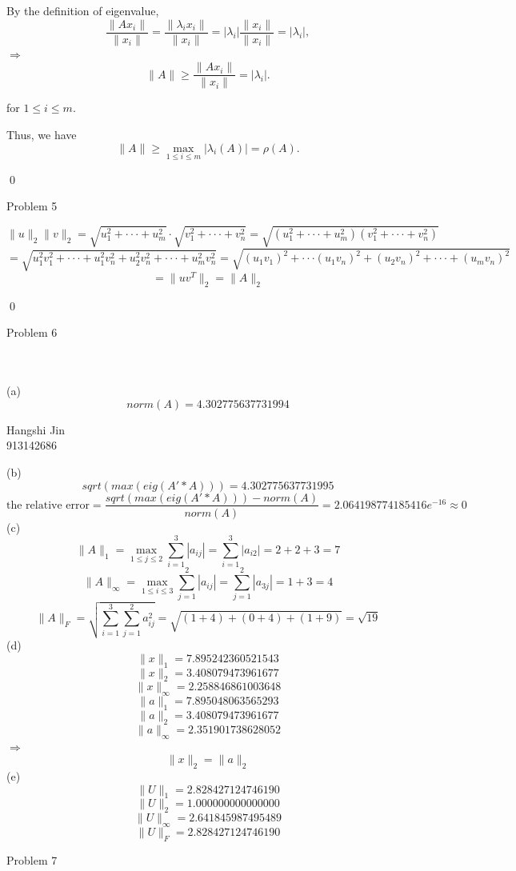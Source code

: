 \documentclass{article}
\begin{document}
By the definition of eigenvalue, \[\frac{\lVert Ax_i\rVert}{\lVert x_i\rVert}=\frac{\lVert \lambda_i x_i\rVert}{\lVert x_i\rVert}=|\lambda_i|\frac{\lVert  x_i\rVert}{\lVert x_i\rVert}=|\lambda_i|,\]
$\Rightarrow$ \[\lVert A\rVert\geq\frac{\lVert Ax_i\rVert}{\lVert x_i\rVert}=|\lambda_i|.\]\begin{flushright}for $1\leq i\leq m$.\end{flushright}
Thus, we have\[\lVert A\rVert\geq\max_{1\leq i\leq m}|\lambda_i(A)|=\rho(A).\]
\begin{flushright}\qed\end{flushright}
\begin{large}Problem 5\end{large}
\[\lVert u\rVert_2\lVert v\rVert_2=\sqrt{u_1^2+\cdot\cdot\cdot+u_m^2}\cdot\sqrt{v_1^2+\cdot\cdot\cdot+v_n^2}=\sqrt{(u_1^2+\cdot\cdot\cdot+u_m^2)(v_1^2+\cdot\cdot\cdot+v_n^2)}\]
\[=\sqrt{u_1^2v_1^2+\cdot\cdot\cdot+u_1^2v_n^2+u_2^2v_n^2+\cdot\cdot\cdot+u_m^2v_n^2}=\sqrt{(u_1v_1)^2+\cdot\cdot\cdot(u_1v_n)^2+(u_2v_n)^2+\cdot\cdot\cdot+(u_mv_n)^2}\]
\[=\lVert uv^T\rVert_2=\lVert A\rVert_2\]\begin{flushright}\qed\end{flushright}
\begin{large}Problem 6\end{large}
\\\\(a)\[norm(A)=4.302775637731994\]
\begin{flushright}Hangshi Jin \\913142686\end{flushright}
(b)\[sqrt(max(eig(A'*A)))=4.302775637731995\]
\[\text{the relative error} = \frac{sqrt(max(eig(A'*A)))-norm(A)}{norm(A)}=2.064198774185416e^{-16}\approx0\]
(c)\[\lVert A\rVert_1=\max_{1\leq j\leq2}\sum_{i=1}^{3}|a_{ij}|=\sum_{i=1}^{3}|a_{i2}|=2+2+3=7\]
\[\lVert A\rVert_\infty=\max_{1\leq i\leq3}\sum_{j=1}^{2}|a_{ij}|=\sum_{j=1}^{2}|a_{3j}|=1+3=4\]
\[\lVert A\rVert_F=\sqrt{\sum_{i=1}^{3}\sum_{j=1}^{2}a_{ij}^2}=\sqrt{(1+4)+(0+4)+(1+9)}=\sqrt{19}\]
(d)\[\lVert x\rVert_1= 7.895242360521543\]
\[\lVert x\rVert_2=3.408079473961677\]
\[\lVert x\rVert_\infty=2.258846861003648\]
\[\lVert a\rVert_1=7.895048063565293\]
\[\lVert a\rVert_2=3.408079473961677\]
\[\lVert a\rVert_\infty=2.351901738628052\]
$\Rightarrow$\[\lVert x\rVert_2=\lVert a\rVert_2\]
(e)\[\lVert U\rVert_1=2.828427124746190\]
\[\lVert U\rVert_2=1.000000000000000\]
\[\lVert U\rVert_\infty=2.641845987495489\]
\[\lVert U\rVert_F=2.828427124746190\]
\begin{large}Problem 7\end{large}
\end{document}
